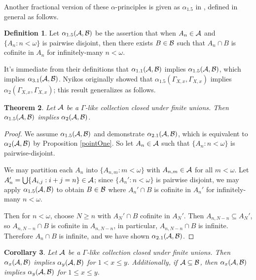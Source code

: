 \documentclass{amsart}
\theoremstyle{plain}
\newtheorem{theorem}{Theorem}
\newtheorem{corollary}[theorem]{Corollary}
\theoremstyle{definition}
\newtheorem{definition}[theorem]{Definition}
\theoremstyle{remark}
\theoremstyle{plain}
\theoremstyle{definition}
\theoremstyle{remark}
\begin{document}
Another fractional version of these \(\alpha\)-principles is given as
\(\alpha_{1.5}\) in \cite{MR1195504}, defined in general as follows.

\begin{definition}
Let \(\alpha_{1.5}(\mathcal{A},\mathcal{B})\) be the assertion that when \(A_n\in\mathcal{A}\)
and \(\{A_n:n<\omega\}\) is pairwise disjoint, then there exists \(B\in\mathcal{B}\)
such that \(A_n\cap B\) is cofinite in \(A_n\) for infinitely-many \(n<\omega\).
\end{definition}

It's immediate from their definitions that 
\(\alpha_{1.1}(\mathcal{A},\mathcal{B})\) implies \(\alpha_{1.5}(\mathcal{A},\mathcal{B})\), which
implies \(\alpha_{3.1}(\mathcal{A},\mathcal{B})\).
Nyikos originally showed that \(\alpha_{1.5}(\Gamma_{X,x},\Gamma_{X,x})\) implies
\(\alpha_2(\Gamma_{X,x},\Gamma_{X,x})\); this result generalizes as follows.

\begin{theorem}
Let \(\mathcal{A}\) be a \(\Gamma\)-like collection closed under finite unions.
Then \(\alpha_{1.5}(\mathcal{A},\mathcal{B})\) implies
\(\alpha_{2}(\mathcal{A},\mathcal{B})\).
\end{theorem}

\begin{proof}
We assume \(\alpha_{1.5}(\mathcal{A},\mathcal{B})\) and demonstrate
\(\alpha_{2.1}(\mathcal{A},\mathcal{B})\), which is equivalent to
\(\alpha_{2}(\mathcal{A},\mathcal{B})\) by Proposition \ref{pointOne}.
So let \(A_n\in\mathcal{A}\) such that \(\{A_n:n<\omega\}\) is pairwise-disjoint.

We may partition each \(A_n\) into \(\{A_{n,m}:m<\omega\}\) with
\(A_{n,m}\in\mathcal{A}\) for all \(m<\omega\). 
Let \(A_n'=\bigcup\{A_{i,j}:i+j=n\}\in\mathcal{A}\);
since \(\{A_n':n<\omega\}\) is pairwise disjoint, we may apply
\(\alpha_{1.5}(\mathcal{A},\mathcal{B})\) to obtain \(B\in\mathcal{B}\) where
\(A_n'\cap B\) is cofinite in \(A_n'\) for infinitely-many \(n<\omega\).

Then for \(n<\omega\), choose \(N\geq n\) with \(A_N'\cap B\) cofinite in \(A_N'\).
Then \(A_{n,N-n}\subseteq A_N'\), 
so \(A_{n,N-n}\cap B\) is cofinite in \(A_{n,N-n}\), in particular,
\(A_{n,N-n}\cap B\) is infinite.
Therefore \(A_n\cap B\) is infinite, and we have shown
\(\alpha_{2.1}(\mathcal{A},\mathcal{B})\).
\end{proof}

\begin{corollary}
Let \(\mathcal{A}\) be a \(\Gamma\)-like collection closed under finite unions.
Then \(\alpha_x(\mathcal{A},\mathcal{B})\) implies \(\alpha_y(\mathcal{A},\mathcal{B})\) for
\(1<x\leq y\). Additionally, if \(\mathcal{A}\subseteq\mathcal{B}\), then 
\(\alpha_x(\mathcal{A},\mathcal{B})\) implies \(\alpha_y(\mathcal{A},\mathcal{B})\) for
\(1\leq x\leq y\).
\end{corollary}
\end{document}
